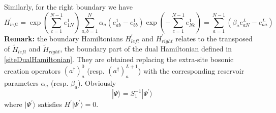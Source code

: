 \documentclass[10pt]{article}
\numberwithin{equation}{section}
\numberwithin{equation}{subsection}
\begin{document}
Similarly, for the right boundary we have 
\begin{equation}
H_{left}^{'}=\exp{\left(\sum_{c=1}^{N-1}e_{1N}^{1}\right)}\sum_{a,b=1}^{N}\alpha_{a}\left(e_{ab}^{1}-e_{bb}^{1}\right)\exp{\left(-\sum_{c=1}^{N-1}e_{Nc}^{1}\right)}=\sum_{a=1}^{N-1}\left(\beta_{a}e_{aN}^{L}-e_{aa}^{L}\right)
\end{equation}
\textbf{Remark:} the boundary Hamiltonians $H_{left}^{'}$ and $H_{right}^{'}$ relates to the transposed of  $\widetilde{H}_{left}$ and $\widetilde{H}_{right}$, the boundary part of the dual Hamiltonian  defined in \eqref{siteDualHamiltonian}. They are obtained replacing the  extra-site bosonic creation operators $(a^{\dagger})_{a}^{0}$  (resp. $(a^{\dagger})_{a}^{L+1}$) with the corresponding reservoir parameters $\alpha_a$ (resp. $\beta_a$).
\newline\newline
Obviously
\begin{equation}\label{S1-Inverse}
	|\Psi\rangle =S_{1}^{-1}|\Psi^{'}\rangle
\end{equation}
where $|\Psi^{'}\rangle$ satisfies $H^{'}|\Psi^{'}\rangle=0$.
\end{document}
